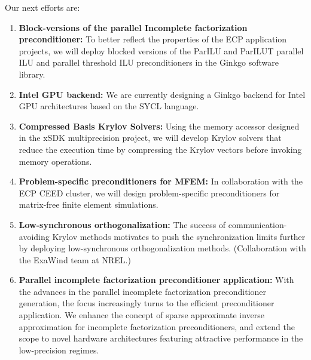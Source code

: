Our next efforts are:
\begin{enumerate}
	\item \textbf{Block-versions of the parallel Incomplete factorization 
	preconditioner:} To better reflect the properties of the ECP application 
	projects, we will deploy blocked versions of the ParILU and ParILUT 
	parallel ILU and parallel threshold ILU preconditioners in the Ginkgo 
	software library.
	\item \textbf{Intel GPU backend:} We are currently designing a Ginkgo 
	backend for Intel GPU architectures based on the SYCL language.
	\item \textbf{Compressed Basis Krylov Solvers:} Using the memory accessor 
	designed in the xSDK multiprecision project, we will develop Krylov solvers 
	that reduce the execution time by compressing the Krylov vectors before 
	invoking memory operations.
	\item \textbf{Problem-specific preconditioners for MFEM:} In collaboration 
	with the ECP CEED cluster, we will design problem-specific preconditioners 
	for matrix-free finite element simulations.
	\item \textbf{Low-synchronous orthogonalization:} The success of 
	communication-avoiding Krylov methods motivates to push the synchronization 
	limits further by deploying low-synchronous orthogonalization methods.
        (Collaboration with the ExaWind team at NREL.)
	\item \textbf{Parallel incomplete factorization preconditioner 
	application:} With the advances in the parallel incomplete factorization
	preconditioner generation, the focus increasingly turns to the efficient 
	preconditioner application. We enhance the concept of sparse approximate 
	inverse approximation for incomplete factorization preconditioners, and 
	extend the scope to novel hardware architectures featuring attractive 
	performance in the low-precision regimes.

\end{enumerate}
